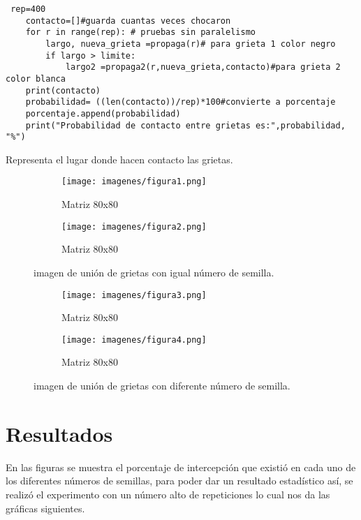 \documentclass{article}
\begin{document}
\renewcommand{\listingscaption}{Código}
\begin{listing}[H]
  \begin{verbatim}
 rep=400
    contacto=[]#guarda cuantas veces chocaron
    for r in range(rep): # pruebas sin paralelismo
        largo, nueva_grieta =propaga(r)# para grieta 1 color negro
        if largo > limite:
            largo2 =propaga2(r,nueva_grieta,contacto)#para grieta 2 color blanca
    print(contacto)
    probabilidad= ((len(contacto))/rep)*100#convierte a porcentaje
    porcentaje.append(probabilidad)
    print("Probabilidad de contacto entre grietas es:",probabilidad, "%")  
  \end{verbatim}
  \label{lst:fibo}
  \caption{Representa el lugar donde hacen contacto las grietas.}
\end{listing}

 \begin{figure}[H]
\centering
\begin{subfigure}[b]{0.35\linewidth}
\texttt{[image: imagenes/figura1.png]}
\caption{Matriz 80x80}
\end{subfigure}
\begin{subfigure}[b]{0.35\linewidth}
\texttt{[image: imagenes/figura2.png]}
\caption{Matriz 80x80}
\end{subfigure}
\caption{imagen de unión de grietas con igual número de semilla.}
\label{fig:westminster}
\end{figure}

\begin{figure}[H]
\centering
\begin{subfigure}[b]{0.35\linewidth}
\texttt{[image: imagenes/figura3.png]}
\caption{Matriz 80x80}
\end{subfigure}
\begin{subfigure}[b]{0.35\linewidth}
\texttt{[image: imagenes/figura4.png]}
\caption{Matriz 80x80}
\end{subfigure}
\caption{imagen de unión de grietas con diferente número de semilla.}
\label{fig:westminster}
\end{figure}


 \newpage
\section{Resultados}
En las figuras se muestra el porcentaje de intercepción que existió en cada uno de los diferentes números de semillas, para poder dar un resultado estadístico así, se realizó el experimento con un número alto de repeticiones lo cual nos da las gráficas siguientes.
\end{document}
